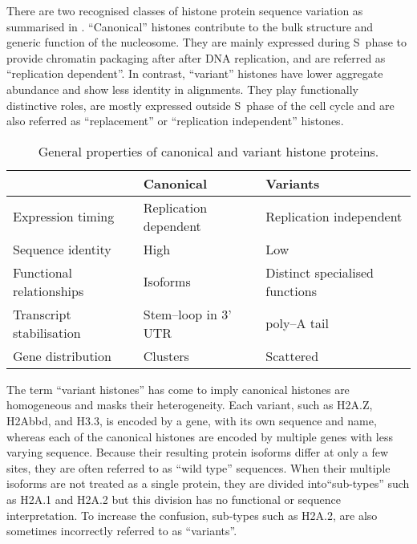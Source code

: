  There are two recognised classes of histone protein sequence variation as summarised
  in . ``Canonical'' histones contribute to the
  bulk structure and generic function of the nucleosome. They are mainly expressed
  during S~phase to provide chromatin packaging after after DNA replication,
  and are referred as ``replication dependent''. In contrast, ``variant'' histones
  have lower aggregate abundance and show less identity in alignments. They play
  functionally distinctive roles, are mostly expressed outside S~phase of the cell
  cycle and are also referred as ``replacement'' or ``replication independent'' histones.

  \begin{table*}
    \caption{General properties of canonical and variant histone proteins.}
    \label{tab:typical-histone-differences}
    \centering
    \begin{tabular}{l l l}
      \toprule
      \null                     & Canonical             & Variants \\
      \midrule
      Expression timing         & Replication dependent & Replication independent \\
      Sequence identity         & High                  & Low \\
      Functional relationships  & Isoforms              & Distinct specialised functions \\
      Transcript stabilisation  & Stem--loop in 3' UTR  & poly--A tail \\
      Gene distribution         & Clusters              & Scattered \\
      \bottomrule
    \end{tabular}
  \end{table*}

  The term ``variant histones'' has come to imply canonical histones are homogeneous
  and masks their heterogeneity. Each variant, such as H2A.Z, H2Abbd, and H3.3,
  is encoded by a gene, with its own sequence and name,
  whereas each of the canonical histones are encoded by multiple genes
  with less varying sequence.
  Because their resulting protein isoforms differ at only a few sites, they are often
  referred to as ``wild type'' sequences.
  When their multiple isoforms are not treated as a single protein, they are divided
  into``sub-types'' such as H2A.1 and H2A.2 but this division has no functional or sequence
  interpretation. To increase the confusion, sub-types such as H2A.2, are also sometimes incorrectly
  referred to as ``variants''.


